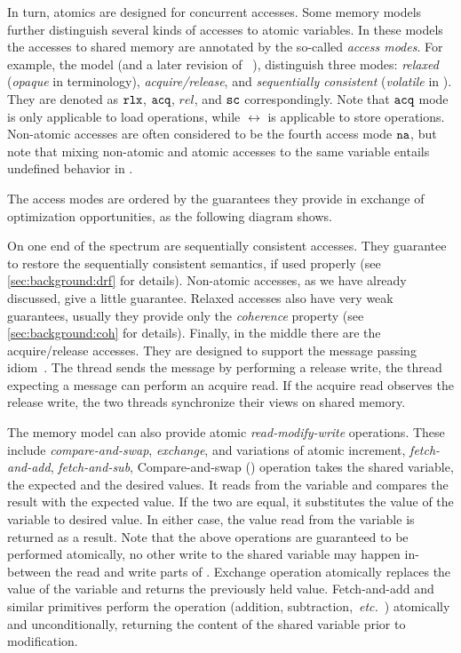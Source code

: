 In turn, atomics are designed for concurrent accesses. 
Some memory models further distinguish 
several kinds of accesses to atomic variables.
In these models the accesses to shared memory are annotated by the 
so-called \emph{access modes}.
For example, the \CPP model (and a later revision of 
\Java~\cite{Bender-Palsberg:OOPSLA19}), distinguish 
three modes: \emph{relaxed} (\emph{opaque} in \Java terminology), 
\emph{acquire/release}, and \emph{sequentially consistent}
(\emph{volatile} in \Java).
They are denoted as $\mathtt{rlx}$, ${\mathtt{acq}}$, $rel$, and ${\mathtt{sc}}$ correspondingly.
Note that ${\mathtt{acq}}$ mode is only applicable to load operations,
while $\rel$ is applicable to store operations.
Non-atomic accesses are often considered to be the fourth access mode $\mathtt{na}$, 
but note that mixing non-atomic and atomic accesses to the same variable 
entails undefined behavior in \CPP.

The access modes are ordered by the guarantees they provide
in exchange of optimization opportunities, as the following 
diagram shows.




On one end of the spectrum are sequentially consistent accesses. 
They guarantee to restore the sequentially consistent semantics, 
if used properly (see \cref{sec:background:drf} for details).
Non-atomic accesses, as we have already discussed, give a little guarantee. 
Relaxed accesses also have very weak guarantees, 
usually they provide only the \emph{coherence} property
(see \cref{sec:background:coh} for details).
Finally, in the middle there are the acquire/release accesses. 
They are designed to support the message passing idiom~\cite{Lahav-al:POPL16}.
The thread sends the message by performing a release write, 
the thread expecting a message can perform an acquire read. 
If the acquire read observes the release write, the two 
threads synchronize their views on shared memory. 

The memory model can also provide atomic \emph{read-modify-write} operations.
These include \emph{compare-and-swap}, \emph{exchange}, and variations of atomic increment,
\eg \emph{fetch-and-add}, \emph{fetch-and-sub}, \etc 
Compare-and-swap (\CAS) operation takes the shared variable, the expected 
and the desired values. It reads from the variable
and compares the result with the expected value. If the two are equal,
it substitutes the value of the variable to desired value. 
In either case, the value read from the variable is returned as a result. 
Note that the above operations are guaranteed to be performed atomically, 
no other write to the shared variable may happen in-between 
the read and write parts of \CAS.
Exchange operation atomically replaces the value 
of the variable and returns the previously held value.
Fetch-and-add and similar primitives perform 
the operation (addition, subtraction,~\emph{etc.}~)
atomically and unconditionally, returning 
the content of the shared variable prior to modification.  

